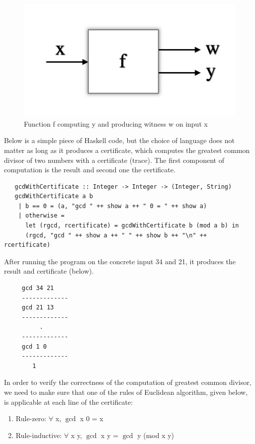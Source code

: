  \begin{figure}[h!]
  \centering
  \includegraphics[width=0.5\linewidth]{figs/funcxy.png}
  \caption{Function f computing y and producing witness w on input x}
  \label{fig:fnxyw}
  \end{figure} 




  \noindent
   Below is a simple piece of Haskell code, but the choice of language does not matter as long as it 
   produces a certificate, which computes the greatest common divisor 
   of two numbers with a certificate (trace).  The first component of computation is the result and second one 
   the certificate. 
   \begin{verbatim}
   gcdWithCertificate :: Integer -> Integer -> (Integer, String)
   gcdWithCertificate a b
    | b == 0 = (a, "gcd " ++ show a ++ " 0 = " ++ show a)
    | otherwise = 
      let (rgcd, rcertificate) = gcdWithCertificate b (mod a b) in
      (rgcd, "gcd " ++ show a ++ " " ++ show b ++ "\n" ++ rcertificate)
   \end{verbatim}
  
   \noindent 
   After running the program on the concrete input 34 and 21, it produces the result and certificate (below).
   \begin{verbatim}
     gcd 34 21
     -------------
     gcd 21 13
     -------------
          .
     -------------
     gcd 1 0 
     -------------
        1
   \end{verbatim}
   
   
   In order to verify the correctness of the computation of greatest common divisor, we need to 
    make sure that one of the rules of Euclidean algorithm, given below, is applicable at 
    each line of the certificate:
   \begin{enumerate}
   \item Rule-zero: $\forall$ x, $\gcd$ x 0 = x
   \item Rule-inductive: $\forall$ x y, $\gcd$ x y = $\gcd$ y (mod x y)
   \end{enumerate}

